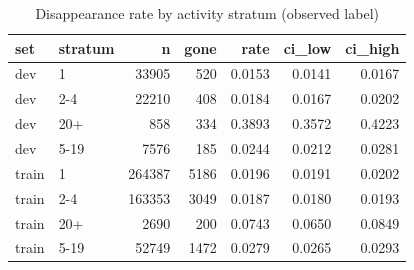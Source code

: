 \begin{table}
\caption{Disappearance rate by activity stratum (observed label)}
\label{tab:tab_base_rate_by_stratum}
\begin{tabular}{llrrrrr}
\toprule
set & stratum & n & gone & rate & ci\_low & ci\_high \\
\midrule
dev & 1 & 33905 & 520 & 0.0153 & 0.0141 & 0.0167 \\
dev & 2-4 & 22210 & 408 & 0.0184 & 0.0167 & 0.0202 \\
dev & 20+ & 858 & 334 & 0.3893 & 0.3572 & 0.4223 \\
dev & 5-19 & 7576 & 185 & 0.0244 & 0.0212 & 0.0281 \\
train & 1 & 264387 & 5186 & 0.0196 & 0.0191 & 0.0202 \\
train & 2-4 & 163353 & 3049 & 0.0187 & 0.0180 & 0.0193 \\
train & 20+ & 2690 & 200 & 0.0743 & 0.0650 & 0.0849 \\
train & 5-19 & 52749 & 1472 & 0.0279 & 0.0265 & 0.0293 \\
\bottomrule
\end{tabular}
\end{table}
